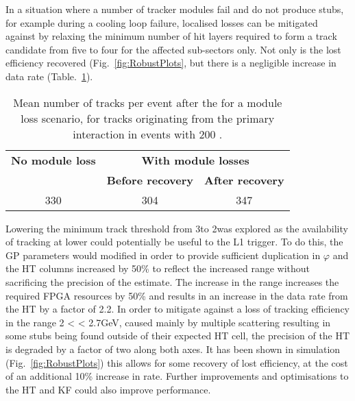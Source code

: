 
In a situation where a number of tracker modules fail and do not produce stubs, for example during a cooling loop failure, localised losses can be mitigated against by relaxing the minimum number of hit layers required to form a track candidate from five to four for the affected sub-sectors only. Not only is the lost efficiency recovered (Fig.~\ref{fig:RobustPlots}, but there is a negligible increase in data rate (Table.~\ref{tab:coolingLoopRate}).

\begin{table}[!t]
\caption{Mean number of tracks per event after the \HT for a module loss scenario, for tracks originating from the primary interaction in \ttbar events with 200 \PU.}
\label{tab:coolingLoopRate}
\centering
\addtolength{\tabcolsep}{1ex}
\begin{tabular}{ccc}
\hline
\bf{No module loss} & \multicolumn{2}{c}{\bf{With module losses}} \\
              & \bf{Before recovery} & \bf{After recovery} \\
\hline
330 & 304 & 347 \\
\hline
\end{tabular}
\addtolength{\tabcolsep}{-1ex}
\end{table}


Lowering the minimum track \pT threshold from 3\GeV to 2\GeV was explored as the availability of tracking at lower \pT could potentially be useful to the L1 trigger. To do this, the GP parameters would modified in order to provide sufficient duplication in $\varphi$ and the HT \qpt columns increased by 50\% to reflect the increased \pT range without sacrificing the precision of the estimate. The increase in the \qpt range increases the required FPGA resources by 50\% and results in an increase in the data rate from the HT by a factor of 2.2. In order to mitigate against a loss of tracking efficiency in the range 2 < \pT < 2.7GeV, caused mainly by multiple scattering resulting in some stubs being found outside of their expected HT cell, the precision of the HT is degraded by a factor of two along both axes. It has been shown in simulation (Fig.~\ref{fig:RobustPlots}) this allows for some recovery of lost efficiency, at the cost of an additional 10\% increase in rate. Further improvements and optimisations to the HT and KF could also improve performance.

